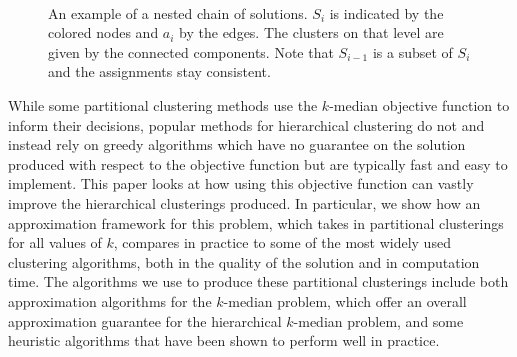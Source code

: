\documentclass[conference, 10pt, final]{IEEEtran}
\begin{document}
\begin{figure}[b]
\centering
{} \hspace{15mm}
 \\
  \hspace{15mm}
\caption{An example of a nested chain of solutions. $S_i$ is indicated by the colored nodes and $a_i$ by the edges. The clusters on that level are given by the connected components. Note that $S_{i-1}$ is a subset of $S_i$ and the assignments stay consistent. }
\label{fig_sim}
\end{figure}

While some partitional clustering methods use the $k$-median objective function to inform their decisions, popular methods for hierarchical clustering do not and instead rely on greedy algorithms which have no guarantee on the solution produced with respect to the objective function but are typically fast and easy to implement. This paper looks at how using this objective function can vastly improve the hierarchical clusterings produced. 
In particular, we show how an approximation framework for this problem, which takes in partitional clusterings for all values of $k$, compares in practice to some of the most widely used clustering algorithms, both in the quality of the solution and in computation time. The algorithms we use to produce these partitional clusterings include both approximation algorithms for the $k$-median problem, which offer an overall approximation guarantee for the hierarchical $k$-median problem, and some heuristic algorithms that have been shown to perform well in practice. 
\end{document}
